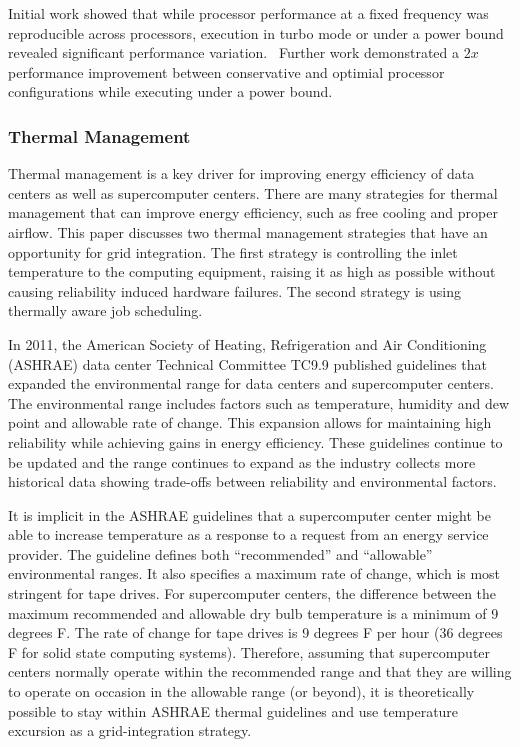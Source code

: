 Initial work showed that while processor performance at a fixed frequency 
was reproducible across processors, execution in turbo mode or under a power
bound revealed significant performance variation.~\cite{Rountree2012} Further
work demonstrated a $2x$ performance improvement between conservative and
optimial processor configurations while executing under a power bound.~\cite{Patki1}


\subsubsection{Thermal Management}

Thermal management is a key driver for improving energy efficiency of data
centers as well as supercomputer centers.  There are many strategies for thermal
management that can improve energy efficiency, such as free cooling and proper
airflow.  This paper discusses two thermal management strategies that have an
opportunity for grid integration.  The first strategy is controlling the inlet
temperature to the computing equipment, raising it as high as possible without
causing reliability induced hardware failures.  The second strategy is using
thermally aware job scheduling.

In 2011, the American Society of Heating, Refrigeration and Air Conditioning
(ASHRAE) data center Technical Committee TC9.9 published guidelines that
expanded the environmental range for data centers and supercomputer
centers. The environmental range includes factors such as temperature, humidity
and dew point and allowable rate of change.  This expansion allows for
maintaining high reliability while achieving gains in energy efficiency.  These
guidelines continue to be updated and the range continues to expand as the
industry collects more historical data showing trade-offs between reliability
and environmental factors.

It is implicit in the ASHRAE guidelines that a supercomputer center might be
able to increase temperature as a response to a request from an energy service
provider.  The guideline defines both “recommended” and
“allowable” environmental ranges.  It also specifies a maximum rate of
change, which is most stringent for tape drives.  For supercomputer centers, the
difference between the maximum recommended and allowable dry bulb temperature is
a minimum of 9 degrees F.  The rate of change for tape drives is 9 degrees F per
hour (36 degrees F for solid state computing systems).   Therefore, assuming
that supercomputer centers normally operate within the recommended range and
that they are willing to operate on occasion in the allowable range (or beyond),
it is theoretically possible to stay within ASHRAE thermal guidelines and use
temperature excursion as a grid-integration strategy.  

